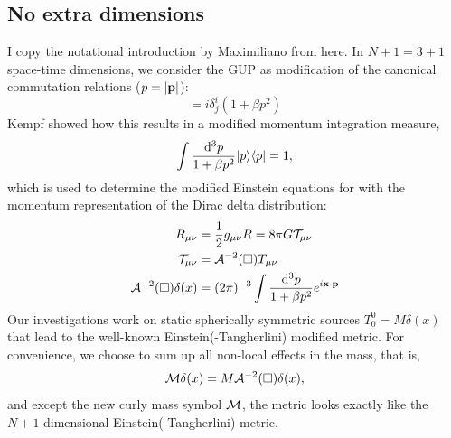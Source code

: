 \documentclass[10pt,a4paper]{article}
\begin{document}
\subsection{No extra dimensions} \label{sec:intro1}
I copy the notational introduction by Maximiliano from \cite{work} here. In $N+1=3+1$ space-time dimensions, we consider the GUP as modification of the canonical commutation relations ($p=|\mathbf{ p }|$):
%
\begin{equation}
[x^i, p_j] = i \delta^i_j (1 + \beta p^2)
\end{equation}
%
Kempf \cite{kempf1995} showed how this results in a modified momentum integration measure,
\begin{equation} \label{eq:GUP1}
\int \frac{\mathrm{d}^3 p}{1 + \beta p^2} | p \rangle\langle p | = 1,
\end{equation}
which is used to determine the modified Einstein equations for with the momentum representation of the Dirac delta distribution:
%
\begin{align}
R_{\mu\nu} &= \frac 12 g_{\mu\nu} R = 8\pi G {\cal T}_{\mu\nu} \\
{\cal T}_{\mu\nu} &= {\cal A}^{-2}(\square) T_{\mu\nu} \\
{\cal A}^{-2}(\square) \delta(x) &= (2\pi)^{-3}
    \int \frac{\mathrm{d}^3 p}{1 + \beta p^2}  e^{i \mathbf{ x } \cdot \mathbf{ p }}
\end{align}
%
Our investigations work on static spherically symmetric sources $T_0^0 = M \delta(x)$ that lead to the well-known Einstein(-Tangherlini) modified metric. For convenience, we choose to sum up all non-local effects in the mass, that is,
%
\begin{equation}
{\cal M} \delta(x) = M {\cal A}^{-2}(\square) \delta(x),
\end{equation}
%
and except the new curly mass symbol ${\cal M}$, the metric looks exactly like the $N+1$ dimensional Einstein(-Tangherlini) metric.
\end{document}
